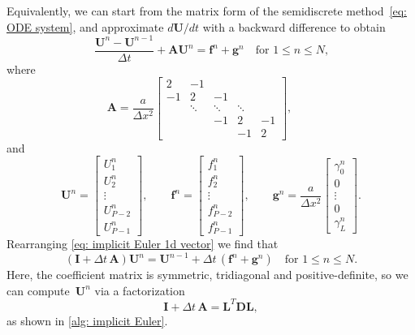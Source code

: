 Equivalently, we can start from the matrix form of the semidiscrete
method~\eqref{eq: ODE system}, and approximate $d\boldsymbol{U}/dt$ with a 
backward difference to obtain
\begin{equation}\label{eq: implicit Euler 1d vector}
\frac{\boldsymbol{U}^n-\boldsymbol{U}^{n-1}}{\Delta t}
	+\boldsymbol{A}\boldsymbol{U}^n=\boldsymbol{f}^n+\boldsymbol{g}^n
\quad\text{for $1\le n\le N$,}
\end{equation}
where
\[
\boldsymbol{A}=\frac{a}{\Delta x^2}\begin{bmatrix}
 2&    -1&      &      &\\
-1&     2&    -1&      &\\
  &\ddots&\ddots&\ddots&\\
  &      &    -1&     2&-1\\
  &      &      &    -1& 2\end{bmatrix},\qquad
\]
and
\[
\boldsymbol{U}^n=\begin{bmatrix}
U^n_1\\ U^n_2\\ \vdots\\ U^n_{P-2}\\ U^n_{P-1}\end{bmatrix},\qquad
\boldsymbol{f}^n=\begin{bmatrix}
f^n_1\\ f^n_2\\ \vdots\\ f^n_{P-2}\\ f^n_{P-1}\end{bmatrix},\qquad
\boldsymbol{g}^n=\frac{a}{\Delta x^2}\begin{bmatrix}
\gamma_0^n\\ 0\\ \vdots\\ 0\\ \gamma_L^n\end{bmatrix}.
\]
Rearranging \eqref{eq: implicit Euler 1d vector} we find that
\[
(\boldsymbol{I}+\Delta t\,\boldsymbol{A})\boldsymbol{U}^n
	=\boldsymbol{U}^{n-1}+\Delta t\,(\boldsymbol{f}^n+\boldsymbol{g}^n)
\quad\text{for $1\le n\le N$.}
\]
Here, the coefficient matrix is symmetric, tridiagonal and positive-definite, 
so we can compute~$\boldsymbol{U}^n$ via a factorization
\[
\boldsymbol{I}+\Delta t\,\boldsymbol{A}
	=\boldsymbol{L}^T\boldsymbol{D}\boldsymbol{L},
\]
as shown in \cref{alg: implicit Euler}.

